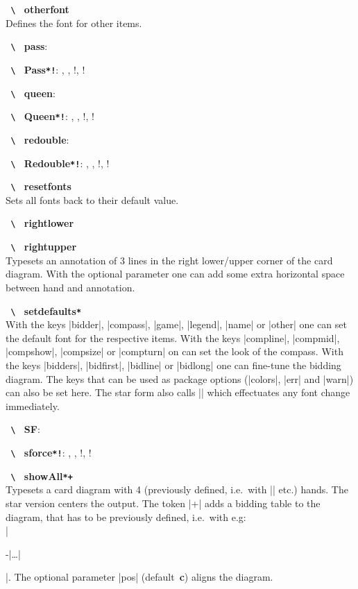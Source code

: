 \documentclass[a4paper,fontsize=11pt,%
  danish,%
  dutch,%
  french,%
  german,%
  norsk,%
  spanish,%
  swedish,%
  turkish,%
  english,%
]{scrartcl}
\newcommand\bs{%
  \texttt{%
    \upshape%
    \textbackslash%
  }%
}%
\let\olditem\item
\renewcommand\item[1][\relax]{\olditem\textbf{\bs#1}}
\newcommand\Oarg[1]{\colorbox{optbackgr}{\texttt{#1}}}
\begin{document}
\begin{description}[itemsep=-0.3em]
\item[otherfont]\\
Defines the font for other items.

\item[pass]: \pass 
\item[Pass\Oarg{*!}]: \Pass, \Pass*, \Pass!, \Pass*! 

\item[queen]: \queen
\item[Queen\Oarg{*!}]: \Queen, \Queen*, \Queen!, \Queen*!

\item[redouble]: \redouble 
\item[Redouble\Oarg{*!}]: \Redouble, \Redouble*, \Redouble!, \Redouble*! 

\item[resetfonts]\\
Sets all fonts back to their default value.

\item[rightlower]
\item[rightupper\Q{[h-offset]{line1}{line2}{line3}}]\\
Typesets an annotation of 3 lines in the right lower/upper corner of the
card diagram. With the optional parameter one can add some extra horizontal
space between hand and annotation.

\item[setdefaults\Oarg{*}\string{key1=val1,key2=val2,\ldots\string}]\\
With the keys |bidder|, |compass|, |game|, |legend|, |name| or |other| one
can set the default font for the respective items. With the keys
|compline|, |compmid|, |compshow|, |compsize| or |compturn| on can set the
look of the compass. With the keys |bidders|, |bidfirst|, |bidline| or
|bidlong| one can fine-tune the bidding diagram. The keys that can be used
as package options (|colors|, |err| and |warn|) can also be set here.
The star form also calls |\resetfonts| which effectuates any font change
immediately.

\item[SF]: \SF
\item[sforce\Oarg{*!}]: \sforce, \sforce*, \sforce!, \sforce*!

\item[showAll\Oarg{*+}\Q{[pos]}]\\
Typesets a card diagram with 4 (previously
defined, i.e.\ with |\northhand| etc.) hands. The star version centers the
output. The token |+| adds a bidding table to the diagram, that has to be
previously defined, i.e.\ with e.g:\\
|\begin{bidding}-|\ldots|\end{bidding}|. The optional parameter |pos|
(default~\textbf{c}) aligns the diagram.


\end{description}
\end{document}
